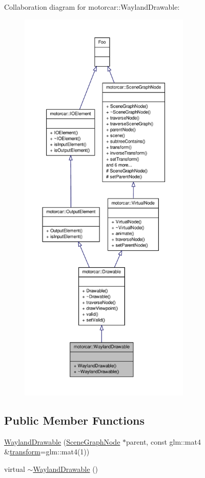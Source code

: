 Collaboration diagram for motorcar\-:\-:Wayland\-Drawable\-:
\nopagebreak
\begin{figure}[H]
\begin{center}
\leavevmode
\includegraphics[height=550pt]{classmotorcar_1_1WaylandDrawable__coll__graph}
\end{center}
\end{figure}
\subsection*{Public Member Functions}
\begin{DoxyCompactItemize}
\item 
\hyperlink{classmotorcar_1_1WaylandDrawable_a8d8eb7dd37be10bf078f681be1d149f2}{Wayland\-Drawable} (\hyperlink{classmotorcar_1_1SceneGraphNode}{Scene\-Graph\-Node} $\ast$parent, const glm\-::mat4 \&\hyperlink{classmotorcar_1_1SceneGraphNode_ad96e79fdd739ac8223a3128003be391a}{transform}=glm\-::mat4(1))
\item 
virtual \hyperlink{classmotorcar_1_1WaylandDrawable_aacd6876953ab2a4488be95bb952411a8}{$\sim$\-Wayland\-Drawable} ()
\end{DoxyCompactItemize}
